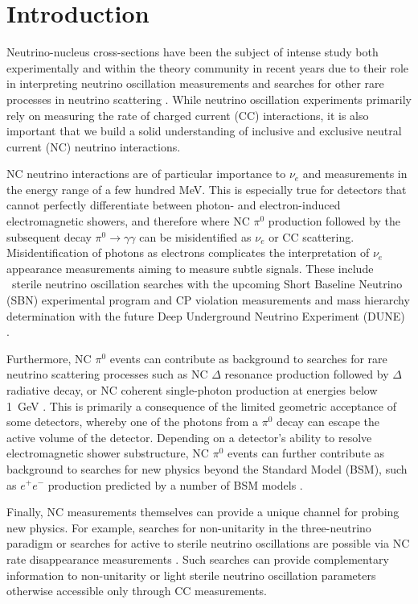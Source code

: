 \section{Introduction}

Neutrino-nucleus cross-sections have been the subject of intense study both experimentally and within the theory community in recent years due to their role in interpreting neutrino oscillation measurements and searches for other rare processes in neutrino scattering \cite{Benhar:2015wva}. While neutrino oscillation experiments primarily rely on measuring the rate of charged current (CC) interactions, it is also important that we build a solid understanding of inclusive and exclusive neutral current (NC) neutrino interactions.

NC neutrino interactions are of particular importance to $\nu_e$ and \nuebar{} measurements in the energy range of a few hundred MeV. This is especially true for detectors that cannot perfectly differentiate between photon- and electron-induced electromagnetic showers, and therefore where NC $\pi^0$ production followed by the subsequent decay $\pi^0 \rightarrow \gamma \gamma$ can be misidentified as $\nu_e$ or \nuebar{} CC scattering. Misidentification of photons as electrons complicates the interpretation of $\nu_e$ appearance measurements aiming to measure subtle signals. These include ~sterile neutrino oscillation searches with the upcoming Short Baseline Neutrino (SBN) experimental program \cite{SBNproposal} and CP violation measurements and mass hierarchy determination with the future Deep Underground Neutrino Experiment (DUNE) \cite{DUNE:2020ypp}. 

Furthermore, NC $\pi^0$ events can contribute as background to searches for rare neutrino scattering processes such as NC $\Delta$ resonance production followed by $\Delta$ radiative decay, or NC coherent single-photon production at energies below 1~GeV \cite{MicroBooNE:2021zai}. This is primarily a consequence of the limited geometric acceptance of some detectors, whereby one of the photons from a $\pi^0$ decay can escape the active volume of the detector. Depending on a detector's ability to resolve electromagnetic shower substructure, NC $\pi^0$ events can further contribute as background to searches for new physics beyond the Standard Model (BSM), such as $e^+e^-$ production predicted by a number of BSM models \cite{Bertuzzo:2018itn,Ballett:2018ynz,Abdullahi:2020nyr,Dutta:2020scq,Abdallah:2020vgg}.


Finally, NC measurements themselves can provide a unique channel for probing new physics. For example, searches for non-unitarity in the three-neutrino paradigm or searches for active to sterile neutrino oscillations are possible via NC rate disappearance measurements \cite{Cianci:2017okw,Furmanski:2020smg}. Such searches can provide complementary information to non-unitarity or light sterile neutrino oscillation parameters otherwise accessible only through CC measurements. 

